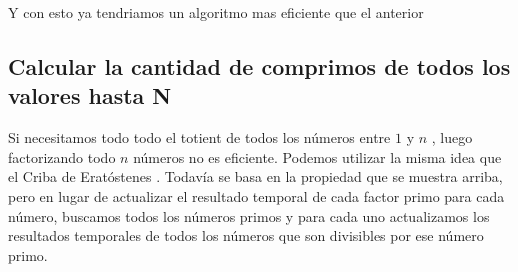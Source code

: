 Y con esto ya tendriamos un algoritmo mas eficiente que el anterior

\subsection{Calcular la cantidad de comprimos de todos los valores hasta N}

Si necesitamos todo todo el totient de todos los números entre $1$ y $n$ , luego factorizando todo $n$ números no es eficiente. Podemos utilizar la misma idea que el Criba de Eratóstenes . Todavía se basa en la propiedad que se muestra arriba, pero en lugar de actualizar el resultado temporal de cada factor primo para cada número, buscamos todos los números primos y para cada uno actualizamos los resultados temporales de todos los números que son divisibles por ese número primo.